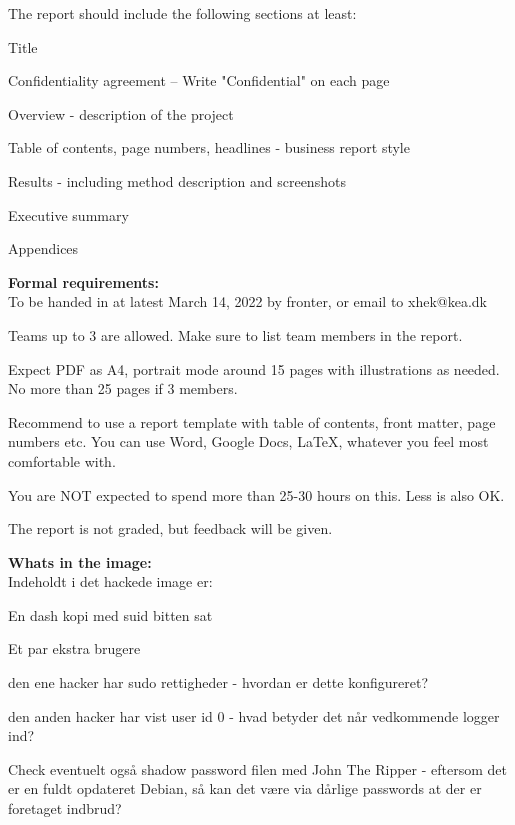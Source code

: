 \documentclass[a4paper,11pt,notitlepage,landscape]{report}
\begin{document}
The report should include the following sections at least:
\begin{list2}
\item Title
\item Confidentiality agreement -- Write "Confidential" on each page
\item Overview - description of the project
\item Table of contents, page numbers, headlines - business report style
\item Results - including method description and screenshots
\item Executive summary
\item Appendices
\end{list2}



{\bf Formal requirements:}\\
To be handed in at latest March 14, 2022 by fronter, or email to xhek@kea.dk

Teams up to 3 are allowed. Make sure to list team members in the report.

Expect PDF as A4, portrait mode around 15 pages with illustrations as needed.
No more than 25 pages if 3 members.

Recommend to use a report template with table of contents, front matter, page numbers etc. You can use Word, Google Docs, \LaTeX, whatever you feel most comfortable with.

You are NOT expected to spend more than 25-30 hours on this. Less is also OK.

The report is not graded, but feedback will be given.


{\bf Whats in the image:}\\
Indeholdt i det hackede image er:

\begin{list2}
\item En dash kopi med suid bitten sat
\item Et par ekstra brugere
\item den ene hacker har sudo rettigheder - hvordan er dette konfigureret?
\item den anden hacker har vist user id 0 - hvad betyder det når
vedkommende logger ind?
\end{list2}

Check eventuelt også shadow password filen med John The Ripper
- eftersom det er en fuldt opdateret Debian, så kan det være via
  dårlige passwords at der er foretaget indbrud?
\end{document}

